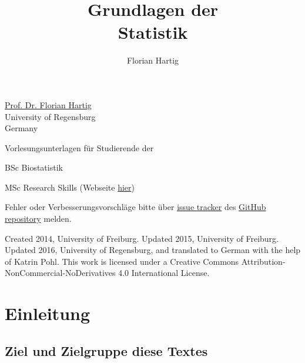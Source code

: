 \documentclass[a4paper,twoside]{tufte-book}\usepackage[]{graphicx}\usepackage[]{color}
\title{Grundlagen der\\Statistik}
\author{Florian Hartig}
\begin{document}

\let\cleardoublepage\clearpage %
\maketitle


\thispagestyle{empty}
\null


\href{http://www.uni-regensburg.de/biologie-vorklinische-medizin/theoretische-oekologie/mitarbeiter/hartig/index.html}{Prof. Dr. Florian Hartig}\\
University of Regensburg\\
Germany\\[0.5cm]

\begin{fullwidth}
Vorlesungsunterlagen für Studierende der

\begin{itemize*}
  \item BSc Biostatistik
  \item MSc Research Skills (Webseite \href{http://florianhartig.github.io/ResearchSkills/}{hier})
\end{itemize*}

\vspace{0.5cm}

Fehler oder Verbesserungsvorschläge bitte über \href{https://github.com/florianhartig/Statistics/issues}{issue tracker} des \href{https://github.com/florianhartig/Statistics/tree/master/EssentialStatistics}{GitHub repository} melden. 

\end{fullwidth}


\vfill
\begin{fullwidth}
Created 2014, University of Freiburg. Updated 2015, University of Freiburg. Updated 2016, University of Regensburg, and translated to German with the help of Katrin Pohl. This work is licensed under a Creative Commons Attribution-NonCommercial-NoDerivatives 4.0 International License.
\end{fullwidth}


\newpage
\tableofcontents

\chapter{Einleitung} %

	\section{Ziel und Zielgruppe diese Textes}
	
\end{document}
